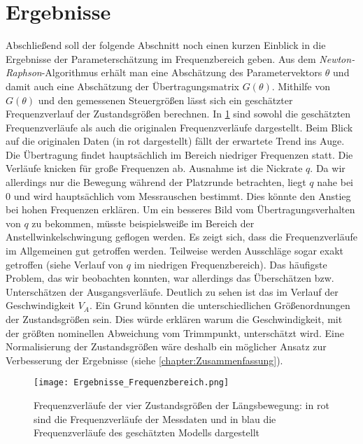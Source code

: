 \section{Ergebnisse}
Abschließend soll der folgende Abschnitt noch einen kurzen Einblick in die Ergebnisse der Parameterschätzung im 
Frequenzbereich geben. Aus dem \textit{Newton-Raphson}-Algorithmus erhält man eine Abschätzung des Parametervektors $\theta$ 
und damit auch eine Abschätzung der Übertragungsmatrix $G(\theta)$. Mithilfe von $G(\theta)$ und den gemessenen Steuergrößen 
lässt sich ein geschätzter Frequenzverlauf der Zustandsgrößen berechnen.
In \cref{fig:Ergebnisse_f} sind sowohl die geschätzten Frequenzverläufe als auch die originalen 
Frequenzverläufe dargestellt. Beim Blick auf die originalen Daten (in rot dargestellt) fällt der erwartete Trend ins Auge. 
Die Übertragung findet hauptsächlich im Bereich niedriger Frequenzen statt. Die Verläufe knicken für große Frequenzen ab. 
Ausnahme ist die Nickrate $q$. Da wir allerdings nur die Bewegung während der Platzrunde betrachten, liegt $q$ nahe bei $ 0 $ 
und wird hauptsächlich vom Messrauschen bestimmt. Dies könnte den Anstieg bei hohen Frequenzen erklären. Um ein besseres Bild 
vom Übertragungsverhalten von $q$ zu bekommen, müsste beispielsweiße im Bereich der Anstellwinkelschwingung geflogen werden. 
Es zeigt sich, dass die Frequenzverläufe im Allgemeinen gut getroffen werden. Teilweise werden Ausschläge sogar exakt 
getroffen (siehe Verlauf von $q$ im niedrigen Frequenzbereich). Das häufigste Problem, das wir beobachten konnten, war 
allerdings das Überschätzen bzw. Unterschätzen der Ausgangsverläufe. Deutlich zu sehen ist das im Verlauf der Geschwindigkeit 
$V_{A}$. Ein Grund könnten die unterschiedlichen Größenordnungen der Zustandsgrößen sein. Dies würde erklären warum die 
Geschwindigkeit, mit der größten nominellen Abweichung vom Trimmpunkt, unterschätzt wird. Eine Normalisierung der 
Zustandsgrößen wäre deshalb ein möglicher Ansatz zur Verbesserung der Ergebnisse (siehe \cref{chapter:Zusammenfassung}). 

\begin{figure}[h!]
	\centering
	\texttt{[image: Ergebnisse\_Frequenzbereich.png]}
	\caption{Frequenzverläufe der vier Zustandsgrößen der Längsbewegung: in rot sind die Frequenzverläufe der Messdaten und 
	in blau die Frequenzverläufe des geschätzten Modells dargestellt}
	\label{fig:Ergebnisse_f}
\end{figure}

